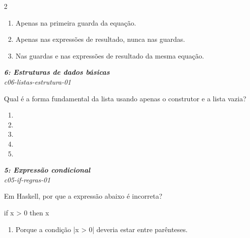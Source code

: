 \documentclass[a4paper,10pt,brazil]{article}
\begin{document}
\begin{multicols}{2}
\begin{enumerate}
  \item Apenas na primeira guarda da equação.

  \item Apenas nas expressões de resultado, nunca nas guardas.

  \item Nas guardas e nas expressões de resultado da mesma equação.


\end{enumerate}

\begin{flushright}
  \footnotesize
  \textit{\textbf{6: Estruturas de dados básicas}}\\
  \textit{c06-listas-estrutura-01}\\

\end{flushright}
Qual é a forma fundamental da lista \haskellinline{['a', 'b', 'c']} usando apenas o construtor \haskellinline{(:)} e a lista vazia?

\begin{enumerate}
  \item {}

  \item \haskellinline{['a'] : ['b'] : ['c']}

  \item {}

  \item {}

  \item {}


\end{enumerate}

\begin{flushright}
  \footnotesize
  \textit{\textbf{5: Expressão condicional}}\\
  \textit{c05-if-regras-01}\\

\end{flushright}
Em Haskell, por que a expressão abaixo é incorreta?
\begin{haskellcode}
if x > 0 then x
\end{haskellcode}

\begin{enumerate}
  \item Porque a condição \haskellinline|x > 0| deveria estar entre parênteses.


\end{enumerate}
\end{multicols}
\end{document}
